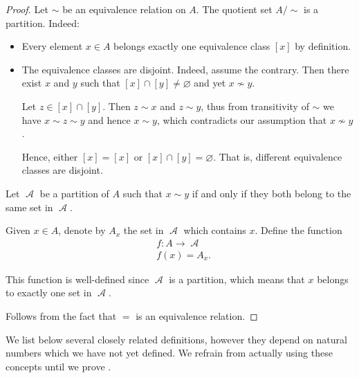 \begin{proof}
   Let \( {\sim} \) be an equivalence relation on \( A \). The quotient set \( A / {\sim} \) is a partition. Indeed:
  \begin{itemize}
    \item Every element \( x \in A \) belongs exactly one equivalence class \( [x] \) by definition.

    \item The equivalence classes are disjoint. Indeed, assume the contrary. Then there exist \( x \) and \( y \) such that \( [x] \cap [y] \neq \varnothing \) and yet \( x \not\sim y \).

    Let \( z \in [x] \cap [y] \). Then \( z \sim x \) and \( z \sim y \), thus from transitivity of \( {\sim} \) we have \( x \sim z \sim y \) and hence \( x \sim y \), which contradicts our assumption that \( x \not\sim y \).

    Hence, either \( [x] = [x] \) or \( [x] \cap [y] = \varnothing \). That is, different equivalence classes are disjoint.
  \end{itemize}

   Let \( \mscrA \) be a partition of \( A \) such that \( x \sim y \) if and only if they both belong to the same set in \( \mscrA \).

  Given \( x \in A \), denote by \( A_x \) the set in \( \mscrA \) which contains \( x \). Define the function
  \begin{equation*}
    \begin{aligned}
      &f: A \to \mscrA \\
      &f(x) = A_x.
    \end{aligned}
  \end{equation*}

  This function is well-defined since \( \mscrA \) is a partition, which means that \( x \) belongs to exactly one set in \( \mscrA \).

   Follows from the fact that \( = \) is an equivalence relation.
\end{proof}

\begin{remark}\label{rem:forward_references_to_natural_numbers_zfc}
  We list below several closely related definitions, however they depend on natural numbers which we have not yet defined. We refrain from actually using these concepts until we prove .
\end{remark}

